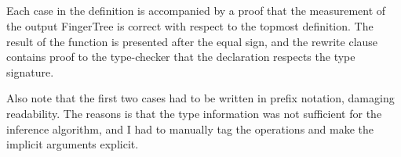 \documentclass[12pt,twoside,notitlepage]{report}
\begin{document}
\begin{code}
\\
\\
\> \AgdaSymbol{:}  \AgdaSymbol{\{}\AgdaSymbol{\}} \AgdaSymbol{\{} \AgdaSymbol{:}  \AgdaSymbol{\}} \AgdaSymbol{\{} \AgdaSymbol{:}  \AgdaSymbol{\}}\<%
\\
\>[2]\<[6]%
\>[6]  \AgdaSymbol{:}   \<%
\\ 
\>[2]\<[6]%
\>[6]  \AgdaSymbol{:}    \<%
\\
\>[2]\<[6]%
\>[6]\AgdaSymbol{\{} \AgdaSymbol{:} \AgdaSymbol{\}}\<%
\\
\>[2]\<[6]%
\>[6] \AgdaSymbol{(} \AgdaSymbol{:} \AgdaSymbol{)}\<%
\\
\>[2]\<[6]%
\>[6]          \AgdaSymbol{\{}\AgdaSymbol{\}}\<%
\\
\>[2]\<[6]%
\>[6]          \AgdaSymbol{\{}    \AgdaSymbol{\}}\<%
\\
\end{code}
Each case in the definition is accompanied by a proof that the measurement of the output FingerTree is correct with respect to the topmost definition. The result of the function is presented after the equal sign, and the rewrite clause contains proof to the type-checker that the declaration respects the type signature.

Also note that the first two cases had to be written in prefix notation, damaging readability. The reasons is that the type information was not sufficient for the inference algorithm, and I had to manually tag the operations and make the implicit arguments explicit.
\end{document}
